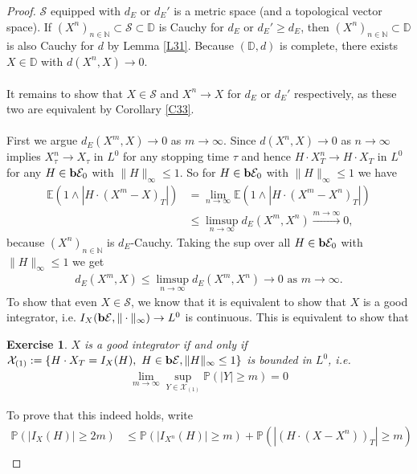 \documentclass[12pt,a4paper, twoside]{article}
\newtheorem{exe}{Exercise}[section]
\theoremstyle{definition}
\newcommand{\EE}{\mathbb{E}} %
\newcommand{\PP}{\mathbb{P}} %
\newcommand{\simple}{\textbf{\text{b}}\mathcal{E}}
\begin{document}
\begin{proof}
$\mathcal{S}$ equipped with $d_E$ or $d_E'$ is a metric space (and a topological vector space). If $(X^n)_{n \in \mathbb{N}} \subset \mathcal{S} \subset \mathbb{D}$ is Cauchy for $d_E$ or $d_E' \geq d_E$, then $(X^n)_{n \in \mathbb{N}} \subset \mathbb{D}$ is also Cauchy for $d$ by Lemma \ref{L31}. Because $( \mathbb{D},d)$ is complete, there exists $X \in \mathbb{D}$ with $d(X^n,X) \to 0$. 
\\\\
It remains to show that $X \in \mathcal{S}$ and $X^n \to X$ for $d_E$ or $d_E'$ respectively, as these two are equivalent by Corollary \ref{C33}. \\
\\
First we argue $d_E(X^m,X) \to 0$ as $m \to \infty$. Since $d(X^n, X) \to 0$ as $n \to \infty$ implies $X_\tau^n \to X_\tau$ in $L^0$ for any stopping time $\tau$ and hence $H \cdot X_T^n \to H \cdot X_T$ in $L^0$ for any $H \in \simple_0$ with $\|H\|_\infty \leq 1$. So for $H \in \simple_0$ with $\|H\|_\infty \leq 1$ we have 
\begin{align*}
\EE(1 \wedge | H \cdot (X^m-X)_T|) &= \lim_{n \to \infty} \EE(1 \wedge |H \cdot (X^m-X^n)_T|) \\ &\leq \limsup_{n \to \infty} d_E(X^m , X^n) \xrightarrow{m \to \infty} 0,
\end{align*}
because $(X^n)_{n \in \mathbb{N}}$ is $d_E$-Cauchy. Taking the sup over all $H \in \simple_0$ with $\|H\|_\infty \leq 1$ we get 
\begin{align*}
d_E(X^m, X) \leq \limsup_{n \to \infty} d_E(X^m,X^n) \to 0 \text{ as } m \to \infty. 
\end{align*}
To show that even $X \in \mathcal{S}$, we know that it is equivalent to show that $X$ is a good integrator, i.e. $I_X(\simple , \| \cdot \|_\infty) \to L^0$ is continuous. This is equivalent to show that 
\begin{exe} $X$ is a good integrator if and only if $\mathcal{X}_{(1)}:= \{ H \cdot X_T = I_X(H), \ H \in \simple, \|H\|_\infty \leq 1\}$ is bounded in $L^0$, i.e.
\begin{align*}
\lim_{m \to \infty} \sup_{Y \in \mathcal{X}_{(1)}} \PP( |Y| \geq m)=0
\end{align*}
\end{exe}
To prove that this indeed holds, write
\begin{align*}
\PP(|I_X(H)| \geq 2m) &\leq \PP( |I_{X^n}(H)| \geq m) +  \PP( |(H \cdot (X-X^n))_T| \geq m) \\

\end{align*}
\end{proof}
\end{document}
